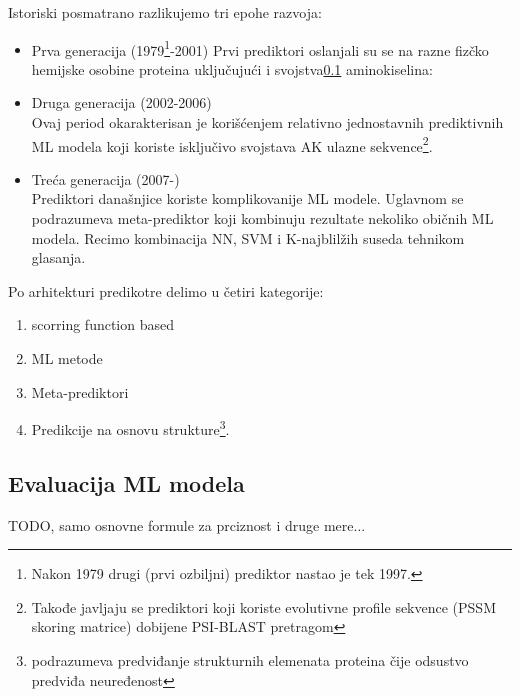 Istoriski posmatrano razlikujemo tri epohe razvoja:\parencite{meng_c2017}
\begin{itemize}
  \item Prva generacija (1979\footnote{
      Nakon 1979 drugi (prvi ozbiljni) prediktor nastao je tek 1997.\parencite{meng_c2017}
    }-2001)
    Prvi prediktori oslanjali su se na razne fizčko hemijske osobine proteina
    uključujući i svojstva\ref{} aminokiselina: 

  \item Druga generacija (2002-2006)\\
    Ovaj period okarakterisan je korišćenjem relativno jednostavnih
    prediktivnih ML modela koji koriste isključivo svojstava AK ulazne
    sekvence\footnote{ Takođe javljaju se prediktori koji koriste evolutivne
      profile sekvence (PSSM skoring matrice) dobijene PSI-BLAST pretragom}.

  \item Treća generacija (2007-)\\
    Prediktori današnjice koriste komplikovanije ML modele. Uglavnom  se
    podrazumeva meta-prediktor koji kombinuju rezultate nekoliko običnih ML
    modela. Recimo kombinacija NN, SVM i K-najblilžih suseda tehnikom
    glasanja.

\end{itemize}


Po arhitekturi predikotre delimo u četiri kategorije:\parencite{meng_c2017}
\begin{enumerate}
  \item
    scorring function based

  \item
    ML metode 

  \item
    Meta-prediktori

  \item
    Predikcije na osnovu strukture\footnote{podrazumeva predviđanje strukturnih
    elemenata proteina čije odsustvo predviđa neuređenost}.
\end{enumerate}


\subsection{Evaluacija ML modela}
TODO, samo osnovne formule za prciznost i druge mere...


